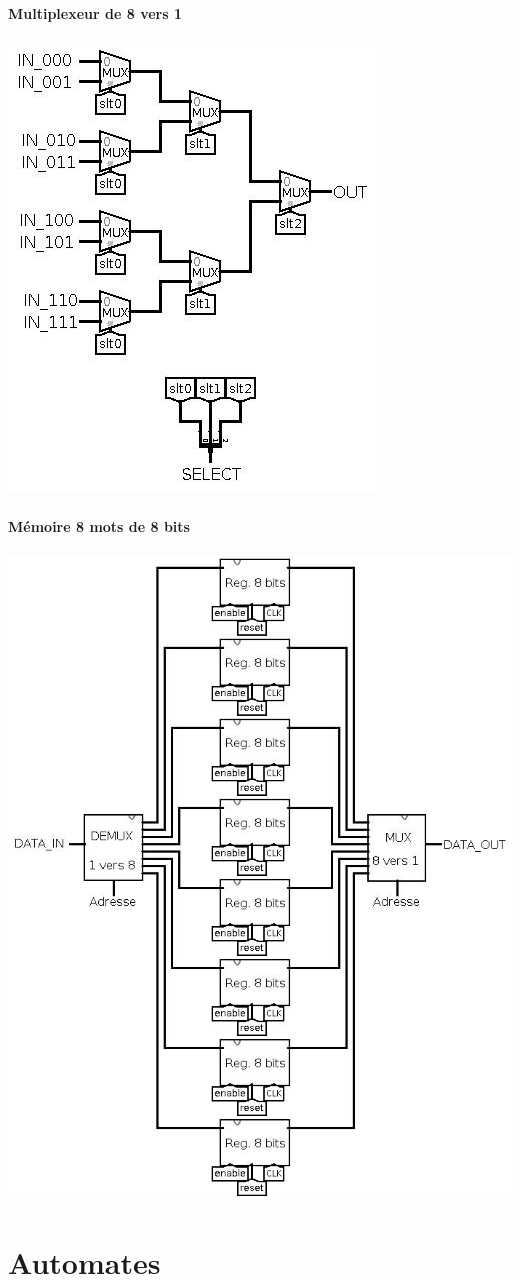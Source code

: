 \documentclass[10pt,a4paper]{article}
\begin{document}
\subsection{Multiplexeur de 8 vers 1}
\includegraphics[scale=0.7]{Mux1vers8.jpg} 

\subsection{Mémoire 8 mots de 8 bits}
\includegraphics[scale=0.4]{Memoire.jpg} 


\newpage
\part{Automates}
\end{document}
